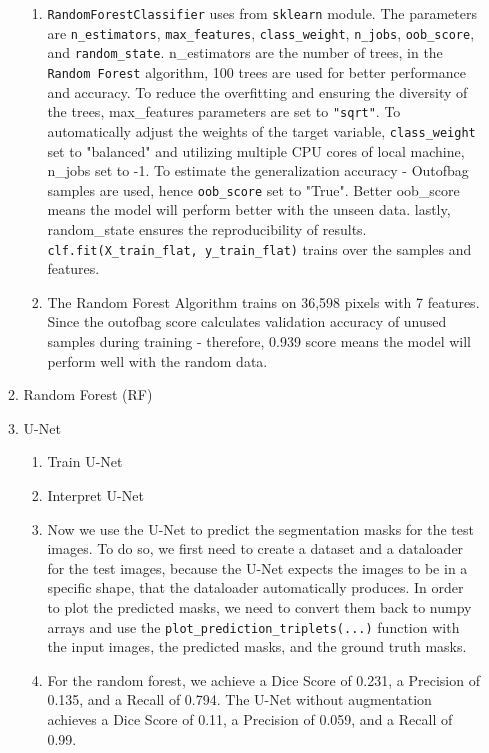 \documentclass[
    a4paper,
    12pt,
    parskip=half,
]{scrarticle}
\begin{document}
\begin{enumerate}
\begin{enumerate}[label=\theenumi.\arabic*.]
\begin{enumerate}[label=\alph*)]
            \item \texttt{RandomForestClassifier} uses from \texttt{sklearn} module. The parameters are \texttt{n\_estimators}, \texttt{max\_features}, \texttt{class\_weight}, \texttt{n\_jobs}, \texttt{oob\_score}, and \texttt{random\_state}. n\_estimators are the number of trees, in the \texttt{Random Forest} algorithm, 100 trees are used for better performance and accuracy.
            To reduce the overfitting and ensuring the diversity of the trees, max\_features parameters are set to \texttt{"sqrt"}. To automatically adjust the weights of the target variable, \texttt{class\_weight} set to "balanced" and utilizing multiple CPU cores of local machine, n\_jobs set to -1. To estimate the generalization accuracy - Out\-of\-bag samples are used, hence \texttt{oob\_score} set to "True". Better oob\_score means the model will perform better with the unseen data. lastly, random\_state ensures the reproducibility of results. \texttt{clf.fit(X\_train\_flat, y\_train\_flat)} trains over the samples and features. 
            \item The Random Forest Algorithm trains on 36,598 pixels with 7 features. Since the out\-of\-bag score calculates validation accuracy of unused samples during training - therefore, 0.939 score means the model will perform well with the random data.
        \end{enumerate}
        \item Random Forest (RF)
        \item U-Net
        \begin{enumerate}[label=\alph*)]
            \item Train U-Net
            \item Interpret U-Net
            \item Now we use the U-Net to predict the segmentation masks for the test images.
            To do so, we first need to create a dataset and a dataloader for the test images, because the U-Net expects the images to be in a specific shape, that the dataloader automatically produces.
            In order to plot the predicted masks, we need to convert them back to numpy arrays and use the \texttt{plot\_prediction\_triplets(...)} function with the input images, the predicted masks, and the ground truth masks.
            \item For the random forest, we achieve a Dice Score of 0.231, a Precision of 0.135, and a Recall of 0.794.
            The U-Net without augmentation achieves a Dice Score of 0.11, a Precision of 0.059, and a Recall of 0.99.

\end{enumerate}
\end{enumerate}
\end{enumerate}
\end{document}
